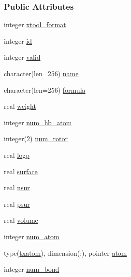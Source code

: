 \subsubsection*{Public Attributes}
\begin{DoxyCompactItemize}
\item 
integer \hyperlink{structcalc__xscore_1_1txmolecule_a5533bc3a6f780914549c5358f7a96230}{xtool\-\_\-format}
\item 
integer \hyperlink{structcalc__xscore_1_1txmolecule_ad6611a3a5574439bc354eb21cdd75937}{id}
\item 
integer \hyperlink{structcalc__xscore_1_1txmolecule_afce205b6bc558aba2f6e29c299e56c6c}{valid}
\item 
character(len=256) \hyperlink{structcalc__xscore_1_1txmolecule_a500e61696ea7af4776ef9b97b0a6df4e}{name}
\item 
character(len=256) \hyperlink{structcalc__xscore_1_1txmolecule_a1f34e11dbb814ee96f65b4e245836679}{formula}
\item 
real \hyperlink{structcalc__xscore_1_1txmolecule_ac0492d67e23ade9b96a8e46416df5fa8}{weight}
\item 
integer \hyperlink{structcalc__xscore_1_1txmolecule_a235f128aa1b8ce8e6cea96378abd07a2}{num\-\_\-hb\-\_\-atom}
\item 
integer(2) \hyperlink{structcalc__xscore_1_1txmolecule_aea578adedd3f9431434bd55820aee2e0}{num\-\_\-rotor}
\item 
real \hyperlink{structcalc__xscore_1_1txmolecule_a4e3e4aad711284f604eaf43234cc1409}{logp}
\item 
real \hyperlink{structcalc__xscore_1_1txmolecule_af965bf7a8cd9fb50bf4a6785a554d913}{surface}
\item 
real \hyperlink{structcalc__xscore_1_1txmolecule_ae29f2d3c0356106aa3e5ca48f8f351d8}{nsur}
\item 
real \hyperlink{structcalc__xscore_1_1txmolecule_a7241db94055a8b9222fbe7ced811bac8}{psur}
\item 
real \hyperlink{structcalc__xscore_1_1txmolecule_a3c6f5949e89b0efeada81a433eaf7265}{volume}
\item 
integer \hyperlink{structcalc__xscore_1_1txmolecule_a079f3cd6dca21a3da9254c418040fd08}{num\-\_\-atom}
\item 
type(\hyperlink{structcalc__xscore_1_1txatom}{txatom}), dimension(\-:), pointer \hyperlink{structcalc__xscore_1_1txmolecule_a9e6e2750caf8ccdef3e7d26f01084839}{atom}
\item 
integer \hyperlink{structcalc__xscore_1_1txmolecule_a7be33ae311e37ae0fa2be83fe9f4fc28}{num\-\_\-bond}

\end{DoxyCompactItemize}
